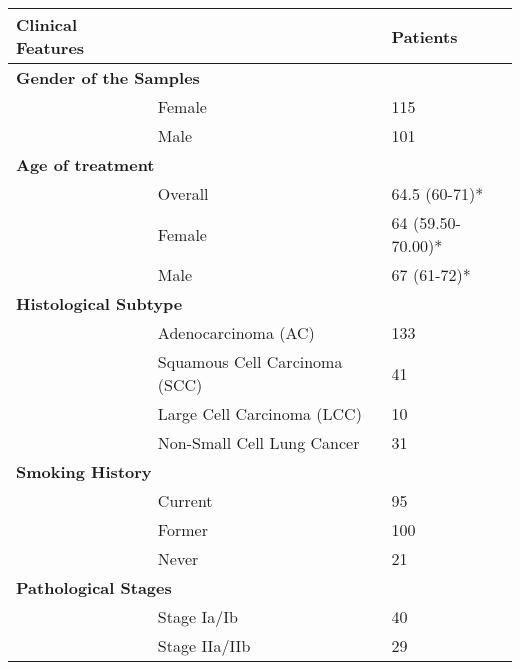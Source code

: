 \begin{table}[thb]
	\centering
	\begin{tabular}{lll}
		\hline
		\textbf{Clinical Features} &  & \textbf{Patients} \\ \hline
		\multicolumn{3}{|l|}{\textbf{Gender of the Samples}} \\ \hline
		\multicolumn{1}{|l|}{} & \multicolumn{1}{l|}{Female} & \multicolumn{1}{l|}{115} \\ \hline
		\multicolumn{1}{|l|}{} & \multicolumn{1}{l|}{Male} & \multicolumn{1}{l|}{101} \\ \hline
		\multicolumn{3}{|l|}{\textbf{Age of treatment}} \\ \hline
		\multicolumn{1}{|l|}{} & \multicolumn{1}{l|}{Overall} & \multicolumn{1}{l|}{64.5 (60-71)*} \\ \hline
		\multicolumn{1}{|l|}{} & \multicolumn{1}{l|}{Female} & \multicolumn{1}{l|}{64 (59.50-70.00)*} \\ \hline
		\multicolumn{1}{|l|}{} & \multicolumn{1}{l|}{Male} & \multicolumn{1}{l|}{67 (61-72)*} \\ \hline
		\multicolumn{3}{|l|}{\textbf{Histological Subtype}} \\ \hline
		\multicolumn{1}{|l|}{} & \multicolumn{1}{l|}{Adenocarcinoma (AC)} & \multicolumn{1}{l|}{133} \\ \hline
		\multicolumn{1}{|l|}{} & \multicolumn{1}{l|}{Squamous Cell Carcinoma (SCC)} & \multicolumn{1}{l|}{41} \\ \hline
		\multicolumn{1}{|l|}{} & \multicolumn{1}{l|}{Large Cell Carcinoma (LCC)} & \multicolumn{1}{l|}{10} \\ \hline
		\multicolumn{1}{|l|}{} & \multicolumn{1}{l|}{Non-Small Cell Lung Cancer} & \multicolumn{1}{l|}{31} \\ \hline
		\multicolumn{3}{|l|}{\textbf{Smoking History}} \\ \hline
		\multicolumn{1}{|l|}{} & \multicolumn{1}{l|}{Current} & \multicolumn{1}{l|}{95} \\ \hline
		\multicolumn{1}{|l|}{} & \multicolumn{1}{l|}{Former} & \multicolumn{1}{l|}{100} \\ \hline
		\multicolumn{1}{|l|}{} & \multicolumn{1}{l|}{Never} & \multicolumn{1}{l|}{21} \\ \hline
		\multicolumn{3}{|l|}{\textbf{Pathological Stages}} \\ \hline
		\multicolumn{1}{|l|}{} & \multicolumn{1}{l|}{Stage Ia/Ib} & \multicolumn{1}{l|}{40} \\ \hline
		\multicolumn{1}{|l|}{} & \multicolumn{1}{l|}{Stage IIa/IIb} & \multicolumn{1}{l|}{29} \\ \hline

\end{tabular}
\end{table}
